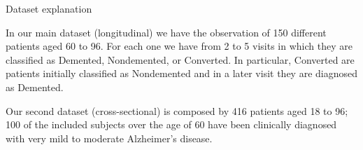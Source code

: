 \documentclass{beamer}
\begin{document}
\begin{frame}{Dataset explanation}

In our main dataset (longitudinal) we have the observation of 150 different patients aged 60 to 96. For each one we have from 2 to 5 visits in which they are classified as Demented, Nondemented, or Converted. In particular, Converted are patients initially classified as Nondemented and in a later visit they are diagnosed as Demented.

\vspace{0.2cm}

Our second dataset (cross-sectional) is composed by 416 patients aged 18 to 96; 100 of the included subjects over the age of 60 have been clinically diagnosed with very mild to moderate Alzheimer’s disease.

 



%			
%			
%			
%		
		
\end{frame}		
		
\end{document}
